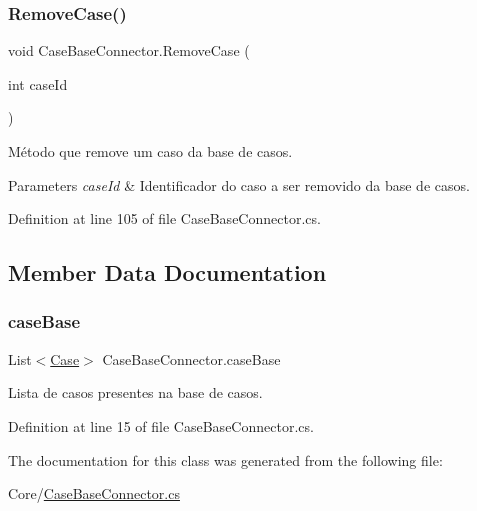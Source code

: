 \hypertarget{class_case_base_connector_a1a85907a149e2bb4e3c198936e6f59d3}{}\label{class_case_base_connector_a1a85907a149e2bb4e3c198936e6f59d3} 
\subsubsection{\texorpdfstring{Remove\+Case()}{RemoveCase()}}
{\footnotesize\ttfamily void Case\+Base\+Connector.\+Remove\+Case (\begin{DoxyParamCaption}\item[{int}]{case\+Id }\end{DoxyParamCaption})}



Método que remove um caso da base de casos. 


\begin{DoxyParams}{Parameters}
{\em case\+Id} & Identificador do caso a ser removido da base de casos.\\
\hline
\end{DoxyParams}


Definition at line 105 of file Case\+Base\+Connector.\+cs.



\subsection{Member Data Documentation}
\hypertarget{class_case_base_connector_afbbc563b42797bf19f8790f40e34425a}{}\label{class_case_base_connector_afbbc563b42797bf19f8790f40e34425a} 
\subsubsection{\texorpdfstring{case\+Base}{caseBase}}
{\footnotesize\ttfamily List$<$\hyperlink{class_case}{Case}$>$ Case\+Base\+Connector.\+case\+Base}



Lista de casos presentes na base de casos. 



Definition at line 15 of file Case\+Base\+Connector.\+cs.



The documentation for this class was generated from the following file\+:\begin{DoxyCompactItemize}
\item 
Core/\hyperlink{_case_base_connector_8cs}{Case\+Base\+Connector.\+cs}\end{DoxyCompactItemize}
